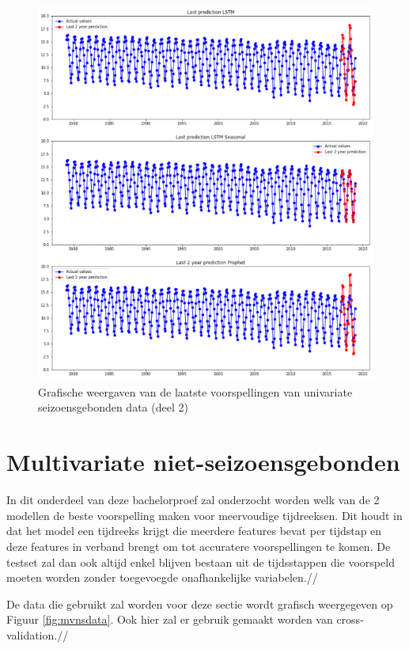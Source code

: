\begin{figure}[!h]
    \centering
    \caption{Grafische weergaven van de laatste voorspellingen van univariate seizoensgebonden data (deel 2)}
    \label{fig:uvsgraph2}
    \includegraphics[width=1\linewidth]{uv_s_graph2}
\end{figure}

\clearpage
\section{Multivariate niet-seizoensgebonden}
In dit onderdeel van deze bachelorproef zal onderzocht worden welk van de 2 modellen de beste voorspelling maken voor meervoudige tijdreeksen. Dit houdt in dat het model een tijdreeks krijgt die meerdere features bevat per tijdstap en deze features in verband brengt om tot accuratere voorspellingen te komen. De testset zal dan ook altijd enkel blijven bestaan uit de tijdsstappen die voorspeld moeten worden zonder toegevoegde onafhankelijke variabelen.//

De data die gebruikt zal worden voor deze sectie wordt grafisch weergegeven op Figuur \ref{fig:mvnsdata}. Ook hier zal er gebruik gemaakt worden van cross-validation.//

